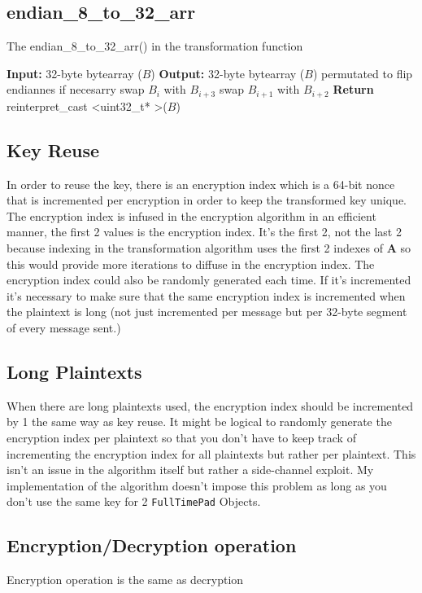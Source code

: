 \documentclass[fleqn, a4paper,12pt]{article}
\begin{document}
\subsection{endian\_8\_to\_32\_arr} \label{dynamic_permutation}

\begin{algorithm}[H] %
\caption{The endian\_8\_to\_32\_arr() in the transformation function}
\begin{algorithmic}[1]  %
\State \textbf{Input:} 32-byte bytearray ($B$)
\State \textbf{Output:} 32-byte bytearray ($B$) permutated to flip endiannes if necesarry
		\State swap $B_i$ with $B_{i+3}$
		\State swap $B_{i+1}$ with $B_{i+2}$
	\EndFor
\EndIf
\State \textbf{Return} reinterpret\_cast \textless uint32\_t* \textgreater ($B$)
\end{algorithmic}
\end{algorithm}

\subsection {Key Reuse}

In order to reuse the key, there is an encryption index which is a 64-bit nonce that is incremented per encryption in order to keep the transformed key unique. The encryption index is infused in the encryption algorithm in an efficient manner, the first 2 values is the encryption index. It's the first 2, not the last 2 because indexing in the transformation algorithm uses the first 2 indexes of \textbf{A} so this would provide more iterations to diffuse in the encryption index. The encryption index could also be randomly generated each time. If it's incremented it's necessary to make sure that the same encryption index is incremented when the plaintext is long (not just incremented per message but per 32-byte segment of every message sent.)

\subsection {Long Plaintexts}

When there are long plaintexts used, the encryption index should be incremented by 1 the same way as key reuse. It might be logical to randomly generate the encryption index per plaintext so that you don't have to keep track of incrementing the encryption index for all plaintexts but rather per plaintext. This isn't an issue in the algorithm itself but rather a side-channel exploit. My implementation of the algorithm doesn't impose this problem as long as you don't use the same key for 2 \texttt{FullTimePad} Objects.

\subsection {Encryption/Decryption operation}

Encryption operation is the same as decryption
\end{document}
